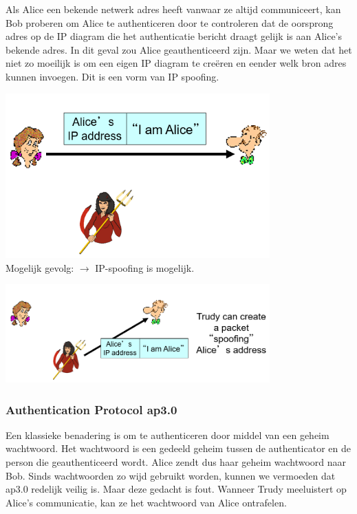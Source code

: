 Als Alice een bekende netwerk adres heeft vanwaar ze altijd communiceert, kan Bob proberen om Alice te authenticeren door te controleren dat de oorsprong adres op de IP diagram die het authenticatie bericht draagt gelijk is aan Alice’s bekende adres. In dit geval zou Alice geauthenticeerd zijn.
Maar we weten dat het niet zo moeilijk is om een eigen IP diagram te creëren en eender welk bron adres kunnen invoegen. Dit is een vorm van IP spoofing.

\includegraphics[width=4in]{./img/imghfdst8/hfdst8puntje14.png}\\[1cm]

Mogelijk gevolg: $\rightarrow$ IP-spoofing is mogelijk.

\includegraphics[width=4in]{./img/imghfdst8/hfdst8puntje15.png}\\[1cm]

\subsubsection{Authentication Protocol ap3.0}

Een klassieke benadering is om te authenticeren door middel van een geheim wachtwoord. Het wachtwoord is een gedeeld geheim tussen de authenticator en de person die geauthenticeerd wordt.
Alice zendt dus haar geheim wachtwoord naar Bob. Sinds wachtwoorden zo wijd gebruikt worden, kunnen we vermoeden dat ap3.0 redelijk veilig is.
Maar deze gedacht is fout. Wanneer Trudy meeluistert op Alice’s communicatie, kan ze het wachtwoord van Alice ontrafelen.

